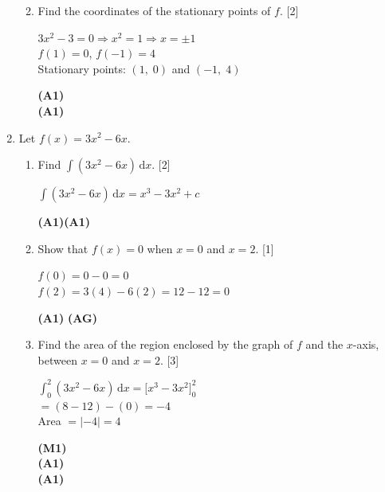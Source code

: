 \documentclass[12pt, twoside]{article}
\begin{document}
\begin{enumerate}[itemsep=0.2cm]
\begin{enumerate}[itemsep=0.3cm]
  \medskip
  \item Find the coordinates of the stationary points of $f$. \hfill [2]

  \begin{minipage}[t]{0.62\textwidth}
  $3x^2 - 3 = 0 \Rightarrow x^2 = 1 \Rightarrow x = \pm 1$\\[0.15cm]
  $f(1) = 0$, \quad $f(-1) = 4$\\[0.15cm]
  Stationary points: $(1,\; 0)$ and $(-1,\; 4)$
  \end{minipage}%
  \begin{minipage}[t]{0.35\textwidth}\raggedleft
  \textbf{(A1)}\\[0.15cm]
  \textbf{(A1)}
  \end{minipage}
\end{enumerate}

\newpage

\item Let $f(x) = 3x^2 - 6x$.

\begin{enumerate}[itemsep=0.3cm]
  \item Find $\displaystyle\int (3x^2 - 6x)\,\mathrm{d}x$. \hfill [2]

  \begin{minipage}[t]{0.62\textwidth}
  $\displaystyle\int (3x^2 - 6x)\,\mathrm{d}x = x^3 - 3x^2 + c$
  \end{minipage}%
  \begin{minipage}[t]{0.35\textwidth}\raggedleft
  \textbf{(A1)(A1)}
  \end{minipage}

  \medskip
  \item Show that $f(x) = 0$ when $x = 0$ and $x = 2$. \hfill [1]

  \begin{minipage}[t]{0.62\textwidth}
  $f(0) = 0 - 0 = 0$\\[0.15cm]
  $f(2) = 3(4) - 6(2) = 12 - 12 = 0$
  \end{minipage}%
  \begin{minipage}[t]{0.35\textwidth}\raggedleft
  \textbf{(A1)} \textbf{(AG)}
  \end{minipage}

  \medskip
  \item Find the area of the region enclosed by the graph of $f$
        and the $x$-axis, between $x = 0$ and $x = 2$. \hfill [3]

  \begin{minipage}[t]{0.62\textwidth}
  $\displaystyle\int_0^2 (3x^2 - 6x)\,\mathrm{d}x
    = \bigl[x^3 - 3x^2\bigr]_0^2$\\[0.3cm]
  $= (8 - 12) - (0) = -4$\\[0.15cm]
  Area $= |-4| = 4$
  \end{minipage}%
  \begin{minipage}[t]{0.35\textwidth}\raggedleft
  \textbf{(M1)}\\[0.3cm]
  \textbf{(A1)}\\[0.15cm]
  \textbf{(A1)}
  \end{minipage}


\end{enumerate}
\end{enumerate}
\end{document}
